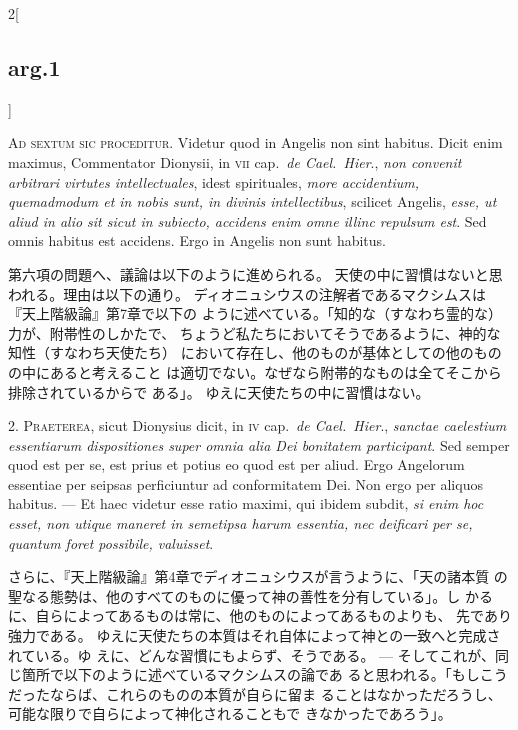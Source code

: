 \documentclass[paper=a4paper,fontsize=10pt,jafontsize=9pt,titlepage]{jlreq}
\begin{document}
\begin{paracol}{2}[\subsection{arg.1}]

{\scshape Ad sextum sic proceditur}. Videtur quod in Angelis non sint
habitus. Dicit enim maximus, Commentator Dionysii, in {\scshape vii}
cap.~{\itshape de Cael.~Hier}., {\itshape non convenit arbitrari
virtutes intellectuales}, idest spirituales, {\itshape more
accidentium, quemadmodum et in nobis sunt, in divinis intellectibus},
scilicet Angelis, {\itshape esse, ut aliud in alio sit sicut in
subiecto, accidens enim omne illinc repulsum est}. Sed omnis habitus
est accidens. Ergo in Angelis non sunt habitus.

\switchcolumn

第六項の問題へ、議論は以下のように進められる。
天使の中に習慣はないと思われる。理由は以下の通り。
ディオニュシウスの注解者であるマクシムスは『天上階級論』第7章で以下の
 ように述べている。「知的な（すなわち霊的な）力が、附帯性のしかたで、
 ちょうど私たちにおいてそうであるように、神的な知性（すなわち天使たち）
 において存在し、他のものが基体としての他のものの中にあると考えること
 は適切でない。なぜなら附帯的なものは全てそこから排除されているからで
 ある」。
ゆえに天使たちの中に習慣はない。


2. {\scshape Praeterea}, sicut Dionysius dicit, in {\scshape iv}
cap.~{\itshape de Cael.~Hier}., {\itshape sanctae caelestium essentiarum
dispositiones super omnia alia Dei bonitatem participant}. Sed semper
quod est per se, est prius et potius eo quod est per aliud. Ergo
Angelorum essentiae per seipsas perficiuntur ad conformitatem Dei. Non
ergo per aliquos habitus. --- Et haec videtur esse ratio maximi, qui
ibidem subdit, {\itshape si enim hoc esset, non utique maneret in semetipsa
harum essentia, nec deificari per se, quantum foret possibile,
valuisset}.

\switchcolumn

さらに、『天上階級論』第4章でディオニュシウスが言うように、「天の諸本質
 の聖なる態勢は、他のすべてのものに優って神の善性を分有している」。し
 かるに、自らによってあるものは常に、他のものによってあるものよりも、
 先であり強力である。
ゆえに天使たちの本質はそれ自体によって神との一致へと完成されている。ゆ
 えに、どんな習慣にもよらず、そうである。
--- そしてこれが、同じ箇所で以下のように述べているマクシムスの論であ
 ると思われる。「もしこうだったならば、これらのものの本質が自らに留ま
 ることはなかっただろうし、可能な限りで自らによって神化されることもで
 きなかったであろう」。


\end{paracol}
\end{document}
